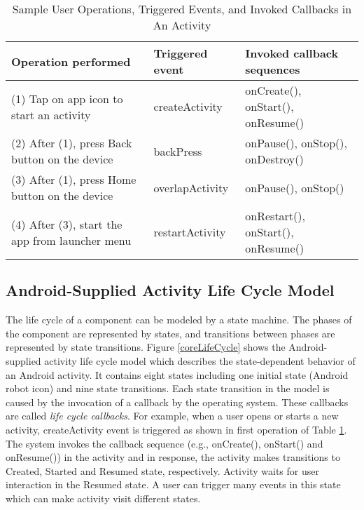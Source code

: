 \documentclass[10pt]{elsarticle}
\begin{document}
\begin{table}[ht] 
\caption{Sample User Operations, Triggered Events, and Invoked Callbacks in An Activity}
\centering 
\scriptsize
\begin{tabular}{l l l} 
\hline
 Operation performed & Triggered event & Invoked callback sequences\\  \hline 
(1) Tap on app icon to start an activity & createActivity & {\ttfamily onCreate()}, {\ttfamily onStart()}, {\ttfamily onResume()} \\
(2) After (1), press Back button on the device & backPress & {\ttfamily onPause()}, {\ttfamily onStop()}, {\ttfamily onDestroy()} \\
(3) After (1), press Home button on the device & overlapActivity & {\ttfamily onPause()}, {\ttfamily onStop()} \\
(4) After (3), start the app from launcher menu & restartActivity & {\ttfamily onRestart()}, {\ttfamily onStart()}, {\ttfamily onResume()} \\

\hline 
\end{tabular} 
\label{tabEventsCallbacks} 
\end{table} 


\subsection{Android-Supplied Activity Life Cycle Model}

The life cycle of a component can be modeled by a state machine. The phases of the component are represented by states, and transitions between phases are represented by state transitions. Figure \ref{coreLifeCycle} shows the Android-supplied activity life cycle model \cite{activityLifeCycle} which describes the state-dependent behavior of an Android activity. It contains eight states including one initial state (Android robot icon) and nine state transitions. Each state transition in the model is caused by the invocation of a callback by the operating system. These callbacks are called \emph{life cycle callbacks}. For example, when a user opens or starts a new activity, createActivity event is triggered as shown in first operation of Table \ref{tabEventsCallbacks}. The system invokes the callback sequence (e.g., {\ttfamily onCreate()}, {\ttfamily onStart()} and {\ttfamily onResume()}) in the activity and in response, the activity makes transitions to Created, Started and Resumed state, respectively. Activity waits for user interaction in the Resumed state. A user can trigger many events in this state which can make activity visit different states. 
\end{document}
